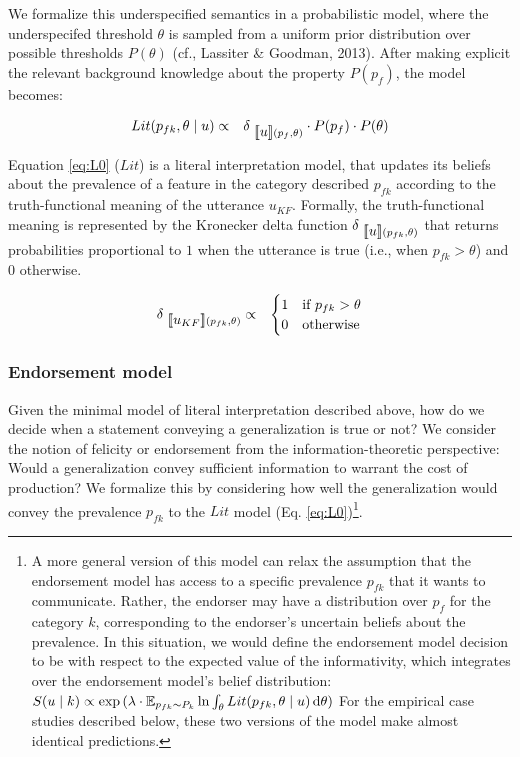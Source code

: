 \documentclass[english,floatsintext,man]{apa6}
\theoremstyle{definition}
\theoremstyle{definition}
\theoremstyle{definition}
\theoremstyle{remark}
\begin{document}
We formalize this underspecified semantics in a probabilistic model,
where the underspecifed threshold \(\theta\) is sampled from a uniform
prior distribution over possible thresholds \(P(\theta)\) (cf., Lassiter
\& Goodman, 2013). After making explicit the relevant background
knowledge about the property \(P(p_f)\), the model becomes:

\begin{eqnarray}
Lit(p_{fk}, \theta \mid u) &\propto& {\delta_{\mbox{ $[\![ u ]\!]$}(p_{f}, \theta)} \cdot P(p_{f}) \cdot P(\theta)} \label{eq:L0}
\end{eqnarray}

Equation \ref{eq:L0} (\(Lit\)) is a literal interpretation model, that
updates its beliefs about the prevalence of a feature in the category
described \(p_{fk}\) according to the truth-functional meaning of the
utterance \(u_{KF}\). Formally, the truth-functional meaning is
represented by the Kronecker delta function
\(\delta_{\mbox{ $[\![ u ]\!]$}(p_{fk}, \theta)}\) that returns probabilities
proportional to \(1\) when the utterance is true (i.e., when
\(p_{fk} > \theta\)) and \(0\) otherwise.

\begin{eqnarray}
\delta_{\mbox{ $[\![ u_{KF} ]\!]$}(p_{fk}, \theta)} &\propto  & \begin{cases}
1 & \text{if } p_{fk} > \theta \\
0 & \text{otherwise}
\end{cases}\label{eq:delta}
\end{eqnarray}

\subsubsection{Endorsement model}\label{endorsement-model}

Given the minimal model of literal interpretation described above, how
do we decide when a statement conveying a generalization is true or not?
We consider the notion of felicity or endorsement from the
information-theoretic perspective: Would a generalization convey
sufficient information to warrant the cost of production? We formalize
this by considering how well the generalization would convey the
prevalence \(p_{fk}\) to the \(Lit\) model (Eq. \ref{eq:L0})\footnote{A
  more general version of this model can relax the assumption that the
  endorsement model has access to a specific prevalence \(p_{fk}\) that
  it wants to communicate. Rather, the endorser may have a distribution
  over \(p_{f}\) for the category \(k\), corresponding to the endorser's
  uncertain beliefs about the prevalence. In this situation, we would
  define the endorsement model decision to be with respect to the
  expected value of the informativity, which integrates over the
  endorsement model's belief distribution:
  \(S(u \mid k) \propto \exp{(\lambda \cdot {\mathbb E}_{p_{fk}\sim P_{k}} \ln{ \int_{\theta} Lit(p_{fk}, \theta \mid u)} \mathop{}\!\mathrm{d}\theta )}\)
  For the empirical case studies described below, these two versions of
  the model make almost identical predictions.}.
\end{document}
